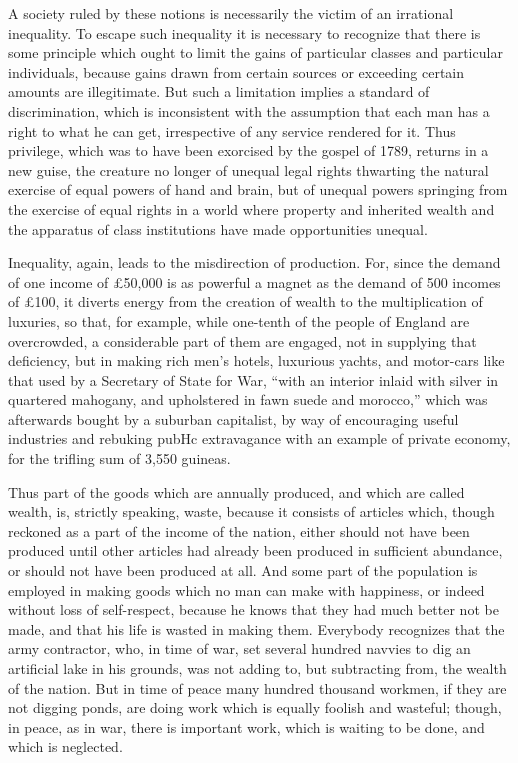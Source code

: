 \documentclass{book}
\begin{document}
A society ruled by these notions is necessarily the victim of an irrational inequality. To escape such inequality it is necessary to recognize that there is some principle which ought to limit the gains of particular classes and particular individuals, because gains drawn from certain sources or exceeding certain amounts are illegitimate. But such a limitation implies a standard of discrimination, which is inconsistent with the assumption that each man has a right to what he can get, irrespective of any service rendered for it. Thus privilege, which was to have been exorcised by the gospel of 1789, returns in a new guise, the creature no longer of unequal legal rights thwarting the natural exercise of equal powers of hand and brain, but of unequal powers springing from the exercise of equal rights in a world where property and inherited wealth and the apparatus of class institutions have made opportunities unequal.

Inequality, again, leads to the misdirection of production. For, since the demand of one income of £50,000 is as powerful a magnet as the demand of 500 incomes of £100, it diverts energy from the creation of wealth to the multiplication of luxuries, so that, for example, while one-tenth of the people of England are overcrowded, a considerable part of them are engaged, not in supplying that deficiency, but in making rich men’s hotels, luxurious yachts, and motor-cars like that used by a Secretary of State for War, “with an interior inlaid with silver in quartered mahogany, and upholstered in fawn suede and morocco,” which was afterwards bought by a suburban capitalist, by way of encouraging useful industries and rebuking pubHc extravagance with an example of private economy, for the trifling sum of 3,550 guineas.

Thus part of the goods which are annually produced, and which are called wealth, is, strictly speaking, waste, because it consists of articles which, though reckoned as a part of the income of the nation, either should not have been produced until other articles had already been produced in sufficient abundance, or should not have been produced at all. And some part of the population is employed in making goods which no man can make with happiness, or indeed without loss of self-respect, because he knows that they had much better not be made, and that his life is wasted in making them. Everybody recognizes that the army contractor, who, in time of war, set several hundred navvies to dig an artificial lake in his grounds, was not adding to, but subtracting from, the wealth of the nation. But in time of peace many hundred thousand workmen, if they are not digging ponds, are doing work which is equally foolish and wasteful; though, in peace, as in war, there is important work, which is waiting to be done, and which is neglected.
\end{document}
